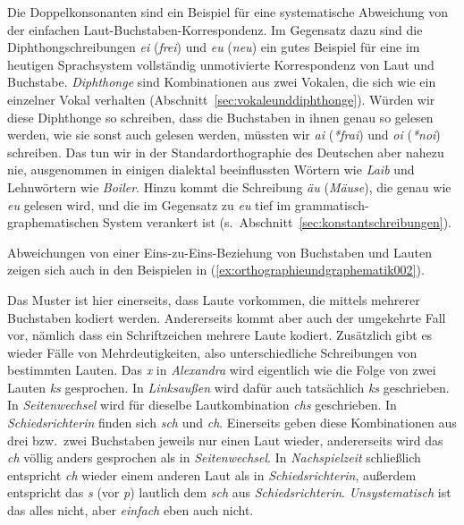 Die Doppelkonsonanten sind ein Beispiel für eine systematische Abweichung von der einfachen Laut-Buchstaben-Korrespondenz.
Im Gegensatz dazu sind die Diphthongschreibungen \textit{ei} (\textit{frei}) und \textit{eu} (\textit{neu}) ein gutes Beispiel für eine im heutigen Sprachsystem vollständig unmotivierte Korrespondenz von Laut und Buchstabe.
\textit{Diphthonge} sind Kombinationen aus zwei Vokalen, die sich wie ein einzelner Vokal verhalten (Abschnitt~\ref{sec:vokaleunddiphthonge}).
Würden wir diese Diphthonge so schreiben, dass die Buchstaben in ihnen genau so gelesen werden, wie sie sonst auch gelesen werden, müssten wir \textit{ai} (\textit{*frai}) und \textit{oi} (\textit{*noi}) schreiben.
Das tun wir in der Standardorthographie des Deutschen aber nahezu nie, ausgenommen in einigen dialektal beeinflussten Wörtern wie \textit{Laib} und Lehnwörtern wie \textit{Boiler}.
Hinzu kommt die Schreibung \textit{äu} (\textit{Mäuse}), die genau wie \textit{eu} gelesen wird, und die im Gegensatz zu \textit{eu} tief im grammatisch-graphematischen System verankert ist (s.\ Abschnitt~\ref{sec:konstantschreibungen}).

Abweichungen von einer Eins-zu-Eins-Beziehung von Buchstaben und Lauten zeigen sich auch in den Beispielen in (\ref{ex:orthographieundgraphematik002}).

\begin{exe}
  \ex\label{ex:orthographieundgraphematik002}
  \begin{xlist}
  \end{xlist}
\end{exe}

Das Muster ist hier einerseits, dass Laute vorkommen, die mittels mehrerer Buchstaben kodiert werden.
Andererseits kommt aber auch der umgekehrte Fall vor, nämlich dass ein Schriftzeichen mehrere Laute kodiert.
Zusätzlich gibt es wieder Fälle von Mehrdeutigkeiten, also unterschiedliche Schreibungen von bestimmten Lauten.
Das \textit{x} in \textit{Alexandra} wird eigentlich wie die Folge von zwei Lauten \textit{ks} gesprochen.
In \textit{Linksaußen} wird dafür auch tatsächlich \textit{ks} geschrieben.
In \textit{Seitenwechsel} wird für dieselbe Lautkombination \textit{chs} geschrieben.
In \textit{Schiedsrichterin} finden sich \textit{sch} und \textit{ch}.
Einerseits geben diese Kombinationen aus drei bzw.\ zwei Buchstaben jeweils nur einen Laut wieder, andererseits wird das \textit{ch} völlig anders gesprochen als in \textit{Seitenwechsel}.
In \textit{Nachspielzeit} schließlich entspricht \textit{ch} wieder einem anderen Laut als in \textit{Schiedsrichterin}, außerdem entspricht das \textit{s} (vor \textit{p}) lautlich dem \textit{sch} aus \textit{Schiedsrichterin}.
\textit{Unsystematisch} ist das alles nicht, aber \textit{einfach} eben auch nicht.

